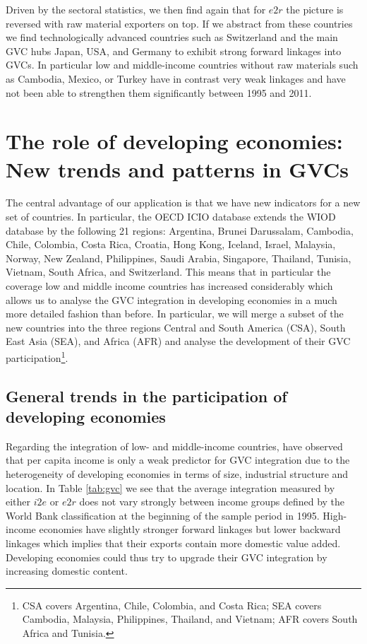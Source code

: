\documentclass[11pt,a4paper]{article}
\begin{document}

Driven by the sectoral statistics, we then find again that for $e2r$ the picture is reversed with raw material exporters on top. If we abstract from these countries we find technologically advanced countries such as Switzerland and the main GVC hubs Japan, USA, and Germany to exhibit strong forward linkages into GVCs. In particular low and middle-income countries without raw materials such as Cambodia, Mexico, or Turkey have in contrast very weak linkages and have not been able to strengthen them significantly between 1995 and 2011.


\section{The role of developing economies: New trends and patterns in GVCs}\label{sec:news}

The central advantage of our application is that we have new indicators for a new set of countries. In particular, the OECD ICIO database extends the WIOD database by the following 21 regions: Argentina, Brunei Darussalam, Cambodia, Chile, Colombia, Costa Rica, Croatia, Hong Kong, Iceland, Israel, Malaysia, Norway, New Zealand, Philippines, Saudi Arabia, Singapore, Thailand, Tunisia, Vietnam, South Africa, and Switzerland. This means that in particular the coverage low and middle income countries has increased considerably which allows us to analyse the GVC integration in developing economies in a much more detailed fashion than before. In particular, we will merge a subset of the new countries into the three regions Central and South America (CSA), South East Asia (SEA), and Africa (AFR) and analyse the development of their GVC participation\footnote{CSA covers Argentina, Chile, Colombia, and Costa Rica; SEA covers Cambodia, Malaysia, Philippines, Thailand, and Vietnam; AFR covers South Africa and Tunisia.}.

\subsection{General trends in the participation of developing economies}

Regarding the integration of low- and middle-income countries, \citet{rojoguno12a} have observed that per capita income is only a weak predictor for GVC integration due to the heterogeneity of developing economies in terms of size, industrial structure and location. In Table \ref{tab:gvc} we see that the average integration measured by either $i2e$ or $e2r$ does not vary strongly between income groups defined by the World Bank classification at the beginning of the sample period in 1995. High-income economies have slightly stronger forward linkages but lower backward linkages which implies that their exports contain more domestic value added. Developing economies could thus try to upgrade their GVC integration by increasing domestic content.
\end{document}
